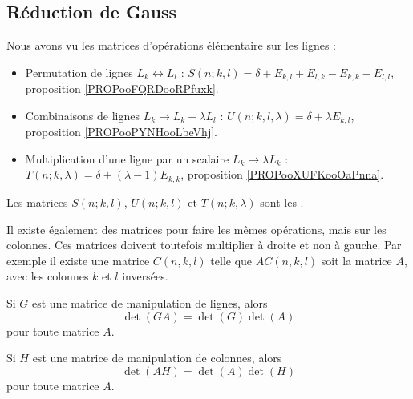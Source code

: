 \subsection{Réduction de Gauss}

\begin{definition}			\label{DEFooKJNNooOcIJuu}
	Nous avons vu les matrices d'opérations élémentaire sur les lignes :
	\begin{itemize}
		\item Permutation de lignes \( L_k\leftrightarrow L_l\)  : \( S(n;k,l)=\delta+E_{k,l}+E_{l,k}-E_{k,k}-E_{l,l}\), proposition \ref{PROPooFQRDooRPfuxk}.
		\item Combinaisons de lignes \( L_k\to L_k+\lambda L_l\) : \( U(n;k,l,\lambda)=\delta+\lambda E_{k,l}\), proposition \ref{PROPooPYNHooLbeVhj}.
		\item Multiplication d'une ligne par un scalaire \( L_k\to \lambda L_k\) : \( T(n;k,\lambda)=\delta+(\lambda-1)E_{k,k}\), proposition \ref{PROPooXUFKooOaPnna}.
	\end{itemize}
	Les matrices \( S(n;k,l)\), \( U(n;k,l)\) et \( T(n;k,\lambda)\) sont les .
\end{definition}


\begin{normaltext}		\label{NORMooDXYZooEdnztA}
	Il existe également des matrices pour faire les mêmes opérations, mais sur les colonnes. Ces matrices doivent toutefois multiplier à droite et non à gauche. Par exemple il existe une matrice \( C(n,k,l)\) telle que \( AC(n,k,l)\) soit la matrice \( A\), avec les colonnes \( k\) et \( l\) inversées.

\end{normaltext}


\begin{lemma}		\label{LEMooDXSZooVpbCRj}
	Si \( G\) est une matrice de manipulation de lignes, alors
	\begin{equation}        \label{EQooLQTVooBYjVYl}
		\det(GA)=\det(G)\det(A)
	\end{equation}
	pour toute matrice \( A\).

	Si \( H\) est une matrice de manipulation de colonnes, alors
	\begin{equation}
		\det(AH)=\det(A)\det(H)
	\end{equation}
	pour toute matrice \( A\).
\end{lemma}

